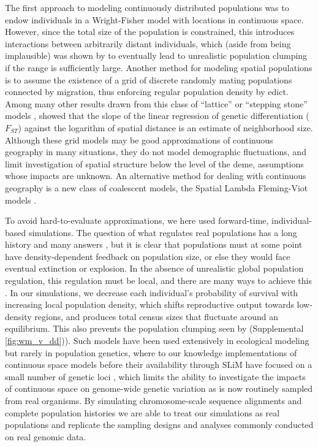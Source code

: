 \documentclass[10pt,twoside,lineno,hidelinks]{preprint}
\begin{document}
The first approach to modeling continuously distributed populations
was to endow individuals in a Wright-Fisher model with locations in continuous space.
However, since the total size of the population is constrained, this introduces interactions between arbitrarily distant individuals,
which (aside from being implausible) 
was shown by \citet{Felsenstein1975} to eventually lead to unrealistic population clumping
if the range is sufficiently large.
Another method for modeling spatial populations is to assume the existence of a grid of discrete randomly mating populations connected by migration, 
thus enforcing regular population density by edict.
Among many other results drawn from this class of ``lattice'' or ``stepping stone'' models
\citep{epperson2003geographical}, 
\citet{Rousset1997} showed that the slope of the linear regression of genetic differentiation ($F_{ST}$) against the logarithm of spatial distance is an estimate of neighborhood size. 
Although these grid models may be good approximations of continuous geography in many situations,
they do not model demographic fluctuations, and limit investigation of spatial structure below the level of the deme,
assumptions whose impacts are unknown. 
An alternative method for dealing with continuous geography is a new class of coalescent models,
the Spatial Lambda Fleming-Viot models \citep{Barton2010,Kelleher2014}.

To avoid hard-to-evaluate approximations, we here used forward-time, individual-based simulations.
The question of what regulates real populations has a long history and many answers
\citep[e.g.,][]{lloyd1967crowding,antonovics1980ecological,crawley1990population}, 
but it is clear that populations must at some point have density-dependent feedback on population size,
or else they would face eventual extinction or explosion.
In the absence of unrealistic global population regulation,
this regulation must be local,
and there are many ways to achieve this \citep{bolker2003spatial}.
In our simulations,
we decrease each individual's probability of survival with increasing local population density,
which shifts reproductive output towards low-density regions,
and produces total census sizes that fluctuate around an equilibrium. 
This also prevents the population clumping seen by \citet{Felsenstein1975}
(Supplemental \autoref{fig:wm_v_dd})). 
Such models have been used extensively in ecological modeling
\citep{durrett1994importance,bolker1997using,law2003population,fournier2004microscopic,champer2019suppression}
but rarely in population genetics, 
where to our knowledge implementations of continuous space models
before their availability through SLiM \citep{Haller2019}
have focused on a small number of genetic loci
\citep[e.g.,][]{slatkin1989comparison,barton2002neutral,robledoarnuncio2010isolation,rossine2014espao},
which limits the ability to investigate the impacts of continuous space on genome-wide genetic variation as is now routinely sampled from real organisms. 
By simulating chromosome-scale sequence alignments and complete population histories we are able to treat our simulations as real populations and replicate the sampling designs and analyses commonly conducted on real genomic data.
\end{document}
